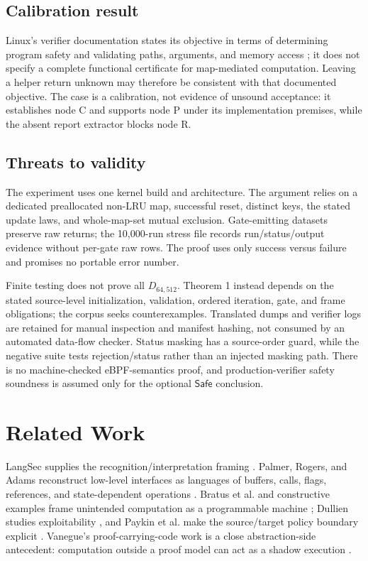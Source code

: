 \documentclass[conference]{IEEEtran}
\begin{document}
\subsection{Calibration result}

Linux's verifier documentation states its objective in terms of determining program safety and validating paths, arguments, and memory access \cite{ref9}; it does not specify a complete functional certificate for map-mediated computation. Leaving a helper return unknown may therefore be consistent with that documented objective. The case is a calibration, not evidence of unsound acceptance: it establishes node C and supports node P under its implementation premises, while the absent report extractor blocks node R.

\subsection{Threats to validity}

The experiment uses one kernel build and architecture. The argument relies on a dedicated preallocated non-LRU map, successful reset, distinct keys, the stated update laws, and whole-map-set mutual exclusion. Gate-emitting datasets preserve raw returns; the 10,000-run stress file records run/status/output evidence without per-gate raw rows. The proof uses only success versus failure and promises no portable error number.

Finite testing does not prove all $D_{64,512}$. Theorem 1 instead depends on the stated source-level initialization, validation, ordered iteration, gate, and frame obligations; the corpus seeks counterexamples. Translated dumps and verifier logs are retained for manual inspection and manifest hashing, not consumed by an automated data-flow checker. Status masking has a source-order guard, while the negative suite tests rejection/status rather than an injected masking path. There is no machine-checked eBPF-semantics proof, and production-verifier safety soundness is assumed only for the optional $\mathsf{Safe}$ conclusion.

\section{Related Work}

LangSec supplies the recognition/interpretation framing \cite{ref1,ref2,ref3,ref4}. Palmer, Rogers, and Adams reconstruct low-level interfaces as languages of buffers, calls, flags, references, and state-dependent operations \cite{ref10}. Bratus et al. and constructive examples frame unintended computation as a programmable machine \cite{ref11,ref12,ref13}; Dullien studies exploitability \cite{ref14}, and Paykin et al. make the source/target policy boundary explicit \cite{ref15}. Vanegue's proof-carrying-code work is a close abstraction-side antecedent: computation outside a proof model can act as a shadow execution \cite{ref16}.
\end{document}
